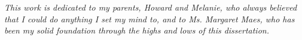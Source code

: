 

\copyrightpage

\begin{dedication}
  \emph{This work is dedicated to my parents, Howard and Melanie, who always
believed that I could do anything I set my mind to, and to Ms. Margaret Maes,
who has been my solid foundation through the highs and lows of this
dissertation.}
\end{dedication}



\pagestyle{deposit}


\begin{acks}

\end{acks}

\renewcommand{\printtoctitle}[1]{\chapter*{#1}}
\renewcommand{\printloftitle}[1]{\chapter*{#1}}
\renewcommand{\printlottitle}[1]{\chapter*{#1}}

\renewcommand{\tocmark}{}
\renewcommand{\lofmark}{}
\renewcommand{\lotmark}{}

\renewcommand{\tocheadstart}{}
\renewcommand{\lofheadstart}{}
\renewcommand{\lotheadstart}{}

\renewcommand{\aftertoctitle}{}
\renewcommand{\afterloftitle}{}
\renewcommand{\afterlottitle}{}

